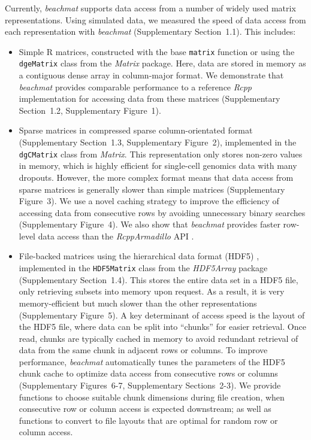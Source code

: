 \documentclass[10pt,letterpaper]{article}
\newcommand{\suppfigsimpleaccess}{1}
\newcommand{\suppfigsparseschem}{2}
\newcommand{\suppfigsparsecol}{3}
\newcommand{\suppfigsparserow}{4}
\newcommand{\suppfighdfspeed}{5}
\newcommand{\suppfighdflayout}{6-7}
\newcommand{\suppsecsimdesign}{1.1}
\newcommand{\suppsecsimple}{1.2}
\newcommand{\suppsecsparse}{1.3}
\newcommand{\suppsechdfmat}{1.4}
\newcommand{\suppseclayoutoptim}{2}
\newcommand{\suppseclayouttest}{3}
\newcommand{\beachmat}{\textit{beachmat}}
\begin{document}
Currently, \beachmat{} supports data access from a number of widely used matrix representations.
Using simulated data, we measured the speed of data access from each representation with \beachmat{} (Supplementary Section~\suppsecsimdesign{}).
This includes:
\begin{itemize}
    \item Simple R matrices, constructed with the base \texttt{matrix} function or using the \texttt{dgeMatrix} class from the \textit{Matrix} package.
        Here, data are stored in memory as a contiguous dense array in column-major format.
        We demonstrate that \beachmat{} provides comparable performance to a reference \textit{Rcpp} implementation for accessing data from these matrices 
        (Supplementary Section~\suppsecsimple{}, Supplementary Figure~\suppfigsimpleaccess{}). 
    \item Sparse matrices in compressed sparse column-orientated format (Supplementary Section~\suppsecsparse{}, Supplementary Figure~\suppfigsparseschem{}), 
        implemented in the \texttt{dgCMatrix} class from \textit{Matrix}.
        This representation only stores non-zero values in memory, which is highly efficient for single-cell genomics data with many dropouts.
        However, the more complex format means that data access from sparse matrices is generally slower than simple matrices (Supplementary Figure~\suppfigsparsecol{}).
        We use a novel caching strategy to improve the efficiency of accessing data from consecutive rows by avoiding unnecessary binary searches (Supplementary Figure~\suppfigsparserow{}).
        We also show that \beachmat{} provides faster row-level data access than the \textit{RcppArmadillo} API \cite{eddelbuettel2014arma}.
    \item File-backed matrices using the hierarchical data format (HDF5) \cite{hdf5}, 
        implemented in the \texttt{HDF5Matrix} class from the \textit{HDF5Array} package (Supplementary Section~\suppsechdfmat{}).
        This stores the entire data set in a HDF5 file, only retrieving subsets into memory upon request.
        As a result, it is very memory-efficient but much slower than the other representations (Supplementary Figure~\suppfighdfspeed{}).
        A key determinant of access speed is the layout of the HDF5 file, where data can be split into ``chunks'' for easier retrieval.
        Once read, chunks are typically cached in memory to avoid redundant retrieval of data from the same chunk in adjacent rows or columns.
        To improve performance, \beachmat{} automatically tunes the parameters of the HDF5 chunk cache to optimize data access from consecutive rows or columns (Supplementary Figures~\suppfighdflayout{}, Supplementary Sections~\suppseclayoutoptim{}-\suppseclayouttest{}).
        We provide functions to choose suitable chunk dimensions during file creation, when consecutive row or column access is expected downstream;
        as well as functions to convert to file layouts that are optimal for random row or column access.
\end{itemize}
\end{document}
